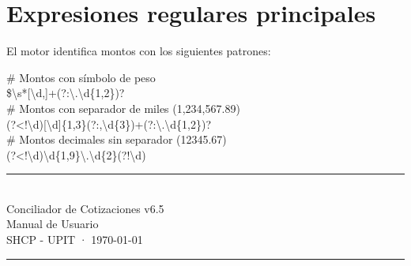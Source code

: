 \documentclass[12pt, a4paper, oneside]{report}
\begin{document}
\section{Expresiones regulares principales}

El motor identifica montos con los siguientes patrones:

\begin{rutabox}
\# Montos con símbolo de peso\\
\$\textbackslash{}s*[\textbackslash{}d,]+(?:\textbackslash{}.\textbackslash{}d\{1,2\})?\\[4pt]
\# Montos con separador de miles (1,234,567.89)\\
(?<!\textbackslash{}d)[\textbackslash{}d]\{1,3\}(?:,\textbackslash{}d\{3\})+(?:\textbackslash{}.\textbackslash{}d\{1,2\})?\\[4pt]
\# Montos decimales sin separador (12345.67)\\
(?<!\textbackslash{}d)\textbackslash{}d\{1,9\}\textbackslash{}.\textbackslash{}d\{2\}(?!\textbackslash{}d)
\end{rutabox}

\clearpage
\thispagestyle{empty}
\pagecolor{white}
\vspace*{\fill}
\begin{center}
  {\color{vino}\rule{0.6\linewidth}{1pt}}\\[12pt]
  {\color{vino}\large Conciliador de Cotizaciones v6.5}\\[6pt]
  {\color{vino}\small Manual de Usuario}\\[6pt]
  {\color{vino}\small SHCP - UPIT · \today}\\[12pt]
  {\color{vino}\rule{0.6\linewidth}{1pt}}
\end{center}
\vspace*{\fill}
\end{document}
